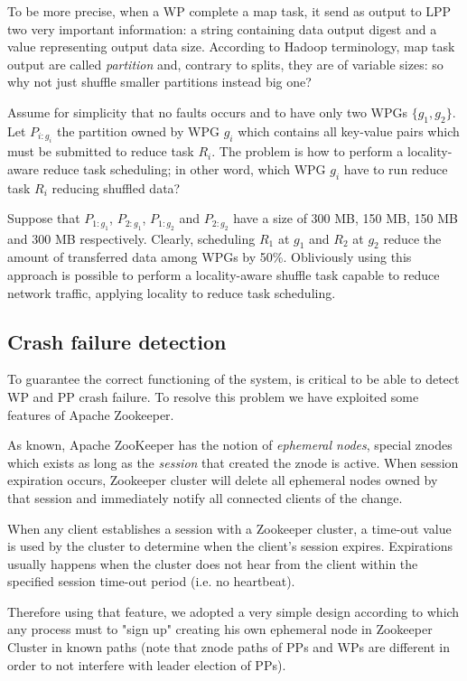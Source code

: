 \documentclass[sigchi]{acmart}
\begin{document}
To be more precise, when a WP complete a map task, it send as output to LPP two very important information: a string containing data output digest and a value representing output data size. According to Hadoop terminology, map task output are called \textit{partition} and, contrary to splits, they are of variable sizes: so why not just shuffle smaller partitions instead big one? 

Assume for simplicity that no faults occurs and to have only two WPGs $\lbrace g_1, g_2 \rbrace$. Let $P_{i:g_i}$ the partition owned by WPG $g_i$ which contains all key-value pairs which must be submitted to reduce task $R_i$. The problem is how to perform a locality-aware reduce task scheduling; in other word, which WPG $g_i$ have to run reduce task $R_i$ reducing shuffled data?

Suppose that $P_{1:g_1}$, $P_{2:g_1}$, $P_{1:g_2}$ and $P_{2:g_2}$ have a size of 300 MB, 150 MB, 150 MB and 300 MB respectively. Clearly, scheduling $R_1$ at $g_1$ and $R_2$ at $g_2$ reduce the amount of transferred data among WPGs by 50\%. Obliviously using this approach is possible to perform a locality-aware shuffle task capable to reduce network traffic, applying locality to reduce task scheduling.  

\subsection{Crash failure detection} To guarantee the correct functioning of the system, is critical to be able to detect WP and PP crash failure. To resolve this problem we have exploited some features of Apache Zookeeper. 

As known, Apache ZooKeeper has the notion of \textit{ephemeral nodes}, special znodes which exists as long as the \textit{session} that created the znode is active. When session expiration occurs, Zookeeper cluster will delete all ephemeral nodes owned by that session and immediately notify all connected clients of the change.

When any client establishes a session with a Zookeeper cluster, a time-out value is used by the cluster to determine when the client's session expires. Expirations usually happens when the cluster does not hear from the client within the specified session time-out period (i.e. no heartbeat).

Therefore using that feature, we adopted a very simple design according to which any process must to "sign up" creating his own ephemeral node in Zookeeper Cluster in known paths (note that znode paths of PPs and WPs are different in order to not interfere with leader election of PPs). 
\end{document}
